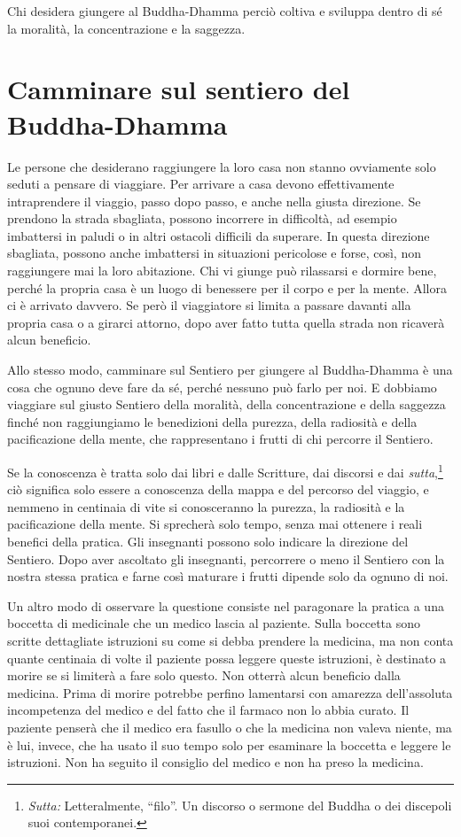 Chi desidera giungere al Buddha-Dhamma perciò coltiva e sviluppa dentro
di sé la moralità, la concentrazione e la saggezza.

\section{Camminare sul sentiero del Buddha-Dhamma}

Le persone che desiderano raggiungere la loro casa non stanno ovviamente
solo seduti a pensare di viaggiare. Per arrivare a casa devono
effettivamente intraprendere il viaggio, passo dopo passo, e anche nella
giusta direzione. Se prendono la strada sbagliata, possono incorrere in
difficoltà, ad esempio imbattersi in paludi o in altri ostacoli
difficili da superare. In questa direzione sbagliata, possono anche
imbattersi in situazioni pericolose e forse, così, non raggiungere mai
la loro abitazione. Chi vi giunge può rilassarsi e dormire bene, perché
la propria casa è un luogo di benessere per il corpo e per la mente.
Allora ci è arrivato davvero. Se però il viaggiatore si limita a passare
davanti alla propria casa o a girarci attorno, dopo aver fatto tutta
quella strada non ricaverà alcun beneficio.

Allo stesso modo, camminare sul Sentiero per giungere al Buddha-Dhamma è
una cosa che ognuno deve fare da sé, perché nessuno può farlo per noi. E
dobbiamo viaggiare sul giusto Sentiero della moralità, della
concentrazione e della saggezza finché non raggiungiamo le benedizioni
della purezza, della radiosità e della pacificazione della mente, che
rappresentano i frutti di chi percorre il Sentiero.

Se la conoscenza è tratta solo dai libri e dalle Scritture, dai discorsi
e dai \emph{sutta},\footnote{\emph{Sutta:} Letteralmente, ``filo''. Un
  discorso o sermone del Buddha o dei discepoli suoi contemporanei.} ciò
significa solo essere a conoscenza della mappa e del percorso del
viaggio, e nemmeno in centinaia di vite si conosceranno la purezza, la
radiosità e la pacificazione della mente. Si sprecherà solo tempo, senza
mai ottenere i reali benefici della pratica. Gli insegnanti possono solo
indicare la direzione del Sentiero. Dopo aver ascoltato gli insegnanti,
percorrere o meno il Sentiero con la nostra stessa pratica e farne così
maturare i frutti dipende solo da ognuno di noi.

Un altro modo di osservare la questione consiste nel paragonare la
pratica a una boccetta di medicinale che un medico lascia al paziente.
Sulla boccetta sono scritte dettagliate istruzioni su come si debba
prendere la medicina, ma non conta quante centinaia di volte il paziente
possa leggere queste istruzioni, è destinato a morire se si limiterà a
fare solo questo. Non otterrà alcun beneficio dalla medicina. Prima di
morire potrebbe perfino lamentarsi con amarezza dell'assoluta
incompetenza del medico e del fatto che il farmaco non lo abbia curato.
Il paziente penserà che il medico era fasullo o che la medicina non
valeva niente, ma è lui, invece, che ha usato il suo tempo solo per
esaminare la boccetta e leggere le istruzioni. Non ha seguito il
consiglio del medico e non ha preso la medicina.

